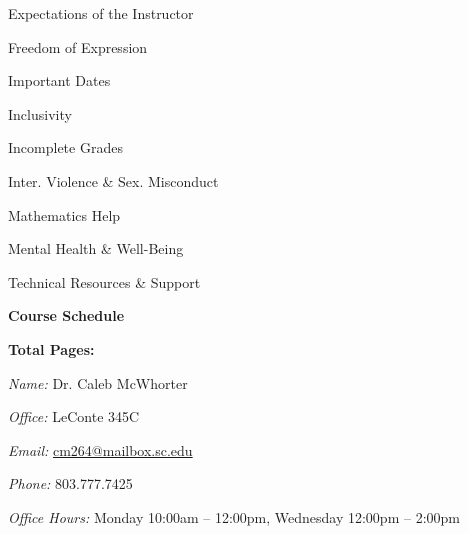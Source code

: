 \documentclass[11pt,letterpaper]{article}
\makeatletter
\newcommand{\instructor}{Dr. Caleb McWhorter}
\newcommand{\office}{LeConte 345C}
\newcommand{\phone}{803.777.7425}
\newcommand{\email}{cm264@mailbox.sc.edu}
\newcommand{\officehours}{Monday 10:00am -- 12:00pm, Wednesday 12:00pm -- 2:00pm}
\makeatother
\begin{document}
\begin{minipage}[t]{0.45\textwidth}
\hspace{0.3cm} Expectations of the Instructor \dotfill \pageref{univ_instructorexp} \par
\hspace{0.3cm} Freedom of Expression \dotfill \pageref{univ_freedexpression} \par
\hspace{0.3cm} Important Dates \dotfill \pageref{univ_dates} \par
\hspace{0.3cm} Inclusivity \dotfill \pageref{univ_inclusion} \par
\hspace{0.3cm} Incomplete Grades \dotfill \pageref{univ_incomplete} \par
\hspace{0.3cm} Inter. Violence \& Sex. Misconduct \dotfill \pageref{univ_viosexmis} \par
\hspace{0.3cm} Mathematics Help \dotfill \pageref{univ_mathhelp} \par
\hspace{0.3cm} Mental Health \& Well-Being \dotfill \pageref{univ_mental} \par
\hspace{0.3cm} Technical Resources \& Support \dotfill \pageref{univ_techsupport} \par
{\bfseries\color{scred} Course Schedule} \dotfill \pageref{schd} \par
\hfill {\bfseries\color{scred} Total Pages:} \pageref*{LastPage}
\end{minipage}
\par\vspace{0.4cm}




\vspace{-0.1cm}  \vspace{-0.4cm}

\textit{Name:} \instructor \par
\textit{Office:} \office \par
\textit{Email:} \href{mailto:\email}{\email} \par
\textit{Phone:} \phone \par
\textit{Office Hours:} \officehours 
\pvspace{0.3cm}
\end{document}
